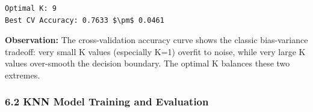 \documentclass[11pt]{article}
\begin{document}
    \begin{Verbatim}[commandchars=\\\{\}]
Optimal K: 9
Best CV Accuracy: 0.7633 $\pm$ 0.0461
    \end{Verbatim}

    \textbf{Observation:} The cross-validation accuracy curve shows the
classic bias-variance tradeoff: very small K values (especially K=1)
overfit to noise, while very large K values over-smooth the decision
boundary. The optimal K balances these two extremes.

    \subsubsection{6.2 KNN Model Training and
Evaluation}\label{knn-model-training-and-evaluation}
\end{document}
